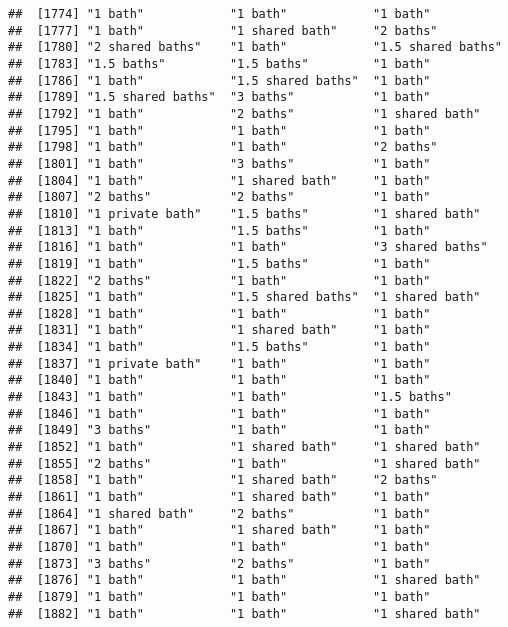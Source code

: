 \documentclass[
]{article}
\begin{document}
\begin{verbatim}
##  [1774] "1 bath"            "1 bath"            "1 bath"           
##  [1777] "1 bath"            "1 shared bath"     "2 baths"          
##  [1780] "2 shared baths"    "1 bath"            "1.5 shared baths" 
##  [1783] "1.5 baths"         "1.5 baths"         "1 bath"           
##  [1786] "1 bath"            "1.5 shared baths"  "1 bath"           
##  [1789] "1.5 shared baths"  "3 baths"           "1 bath"           
##  [1792] "1 bath"            "2 baths"           "1 shared bath"    
##  [1795] "1 bath"            "1 bath"            "1 bath"           
##  [1798] "1 bath"            "1 bath"            "2 baths"          
##  [1801] "1 bath"            "3 baths"           "1 bath"           
##  [1804] "1 bath"            "1 shared bath"     "1 bath"           
##  [1807] "2 baths"           "2 baths"           "1 bath"           
##  [1810] "1 private bath"    "1.5 baths"         "1 shared bath"    
##  [1813] "1 bath"            "1.5 baths"         "1 bath"           
##  [1816] "1 bath"            "1 bath"            "3 shared baths"   
##  [1819] "1 bath"            "1.5 baths"         "1 bath"           
##  [1822] "2 baths"           "1 bath"            "1 bath"           
##  [1825] "1 bath"            "1.5 shared baths"  "1 shared bath"    
##  [1828] "1 bath"            "1 bath"            "1 bath"           
##  [1831] "1 bath"            "1 shared bath"     "1 bath"           
##  [1834] "1 bath"            "1.5 baths"         "1 bath"           
##  [1837] "1 private bath"    "1 bath"            "1 bath"           
##  [1840] "1 bath"            "1 bath"            "1 bath"           
##  [1843] "1 bath"            "1 bath"            "1.5 baths"        
##  [1846] "1 bath"            "1 bath"            "1 bath"           
##  [1849] "3 baths"           "1 bath"            "1 bath"           
##  [1852] "1 bath"            "1 shared bath"     "1 shared bath"    
##  [1855] "2 baths"           "1 bath"            "1 shared bath"    
##  [1858] "1 bath"            "1 shared bath"     "2 baths"          
##  [1861] "1 bath"            "1 shared bath"     "1 bath"           
##  [1864] "1 shared bath"     "2 baths"           "1 bath"           
##  [1867] "1 bath"            "1 shared bath"     "1 bath"           
##  [1870] "1 bath"            "1 bath"            "1 bath"           
##  [1873] "3 baths"           "2 baths"           "1 bath"           
##  [1876] "1 bath"            "1 bath"            "1 shared bath"    
##  [1879] "1 bath"            "1 bath"            "1 bath"           
##  [1882] "1 bath"            "1 bath"            "1 shared bath"    

\end{verbatim}
\end{document}
